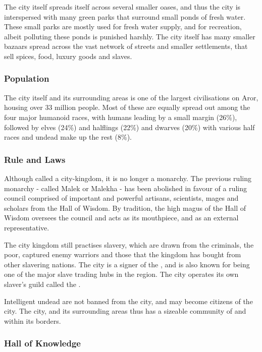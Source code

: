 The city itself spreads itself across several smaller oases, and thus the city
is interspersed with many green parks that surround small ponds of fresh
water. These small parks are mostly used for fresh water supply, and for
recreation, albeit polluting these ponds is punished harshly. The city itself
has many smaller bazaars spread across the vast network of streets and smaller
settlements, that sell spices, food, luxury goods and slaves.

\subsubsection{Population}

The city itself and its surrounding areas is one of the largest civilisations
on Aror, housing over 33 million people. Most of these are equally spread out
among the four major humanoid races, with humans leading by a small margin
(26\%), followed by elves (24\%) and halflings (22\%) and dwarves (20\%) with
various half races and undead make up the rest (8\%).

\subsubsection{Rule and Laws}

Although called a city-kingdom, it is no longer a monarchy. The previous ruling
monarchy - called Malek or Malekha - has been abolished in favour of a ruling
council comprised of important and powerful artisans, scientists, mages and
scholars from the Hall of Wisdom. By tradition, the high magus of the Hall of
Wisdom oversees the council and acts as its mouthpiece, and as an external
representative.

The city kingdom still practises slavery, which are drawn from the criminals,
the poor, captured enemy warriors and those that the kingdom has bought from
other slavering nations. The city is a signer of the , and is also known for being one of the major slave trading hubs in
the region. The city operates its own slaver's guild called the
.

Intelligent undead are not banned from the city, and may become citizens of
the city. The city, and its surrounding areas thus has a sizeable community of
 and  within its borders.

\subsubsection{Hall of Knowledge}
\label{sec:Hall of Knowledge}

